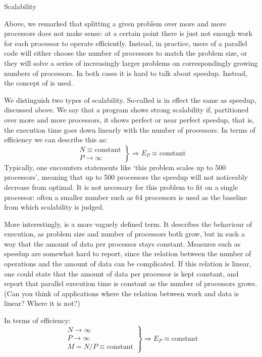 
 {Scalability}
\label{sec:scaling}

Above, we remarked that splitting a given problem over more and more
processors does not make sense: at a certain point there is just not
enough work for each processor to operate efficiently. Instead, in
practice, users of a parallel code will either choose the number of
processors to match the problem size, or they will solve a series of
increasingly larger problems on correspondingly growing numbers of
processors. In both cases it is hard to talk about speedup. Instead,
the concept of  is used.

We distinguish two types of scalability. So-called
 is in effect the same as speedup,
discussed above. We say that a program shows strong scalability if,
partitioned over more and more processors, it shows perfect or near
perfect speedup, that is, the execution time goes down linearly with
the number of processors. In terms of efficiency we can describe this
as:
\[ \left.
\begin{array}{l}
  N\equiv\mathrm{constant}\\ P\rightarrow\infty
\end{array}
\right\} \Rightarrow E_P\approx\mathrm{constant}
\]
Typically, one encounters statements like `this
problem scales up to 500 processors', meaning that up to 500
processors the speedup will not noticeably decrease from optimal. It
is not necessary for this problem to fit on a single processor: often
a smaller number such as 64 processors is used as the baseline from
which scalability is judged.

More interestingly,  is a more vaguely
defined term. It describes the behaviour of execution, as problem size and number of
processors both grow, but in such a way that the amount of data per processor
stays constant. 
Measures such as speedup are somewhat hard to report, since
the relation between the number of operations and the amount of data
can be complicated. If this relation is linear, one could state that
the amount of data per processor is kept constant, and report that parallel
execution time is constant as the number of processors grows.
(Can you think of applications where the relation between work and
data is linear? Where it is not?)

In terms of efficiency:
\[ \left.
\begin{array}{l}
  N\rightarrow\infty\\ P\rightarrow\infty\\ M=N/P\equiv\mathrm{constant}
\end{array}
\right\} \Rightarrow E_P\approx\mathrm{constant}
\]

